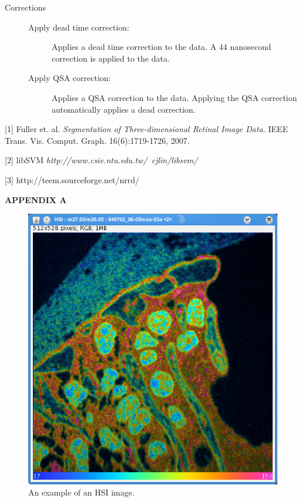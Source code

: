 \documentclass{article}
\begin{document}
\begin{description}
\begin{description}
	\end{description}
	
	\item[\large{Corrections}] \indent                       
	
	\begin{description}
	
	\item[Apply dead time correction:] Applies a dead time correction to the data. A 44 nanosecond
	correction is applied to the data.
	
	\item[Apply QSA correction:] Applies a QSA correction to the data. Applying the QSA correction
	automatically applies a dead correction.
	
	\end{description}
	\end{description}
	
	\vfill
	
	[1]  Fuller et. al. \textit{Segmentation of Three-dimensional Retinal Image Data.} 
	IEEE Trans. Vis. Comput. Graph. 16(6):1719-1726, 2007.

	[2] libSVM  \textit{http://www.csie.ntu.edu.tw/~cjlin/libsvm/}
	
	[3] http://teem.sourceforge.net/nrrd/

	\clearpage

\newpage
\begin{center}\LARGE{\textbf{APPENDIX A}}\end{center} 
\vfill
\begin{figure}[htp!]
\centering
\includegraphics[scale=1.0]{snapshot_HSIimage.png}
\caption{An example of an HSI image.}
\end{figure}
\vfill
\end{document}
